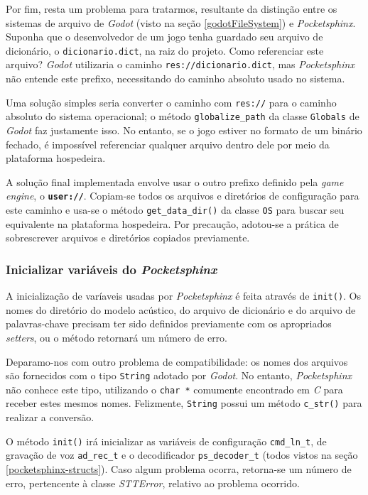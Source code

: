 Por fim, resta um problema para tratarmos, resultante da distinção entre os sistemas de arquivo de \textit{Godot} (visto na seção \ref{godotFileSystem}) e \textit{Pocketsphinx}. Suponha que o desenvolvedor de um jogo tenha guardado seu arquivo de dicionário, o \texttt{dicionario.dict}, na raiz do projeto. Como referenciar este arquivo? \textit{Godot} utilizaria o caminho \texttt{res://dicionario.dict}, mas \textit{Pocketsphinx} não entende este prefixo, necessitando do caminho absoluto usado no sistema.

Uma solução simples seria converter o caminho com \texttt{res://} para o caminho absoluto do sistema operacional; o método \texttt{globalize\_path} da classe \texttt{Globals} de \textit{Godot} faz justamente isso. No entanto, se o jogo estiver no formato de um binário fechado, é impossível referenciar qualquer arquivo dentro dele por meio da plataforma hospedeira.

A solução final implementada envolve usar o outro prefixo definido pela \textit{game engine}, o \textbf{\texttt{user://}}. Copiam-se todos os arquivos e diretórios de configuração para este caminho e usa-se o método \texttt{get\_data\_dir()} da classe \texttt{OS} para buscar seu equivalente na plataforma hospedeira. Por precaução, adotou-se a prática de sobrescrever arquivos e diretórios copiados previamente.

\subsubsection{Inicializar variáveis do \textit{Pocketsphinx}}

A inicialização de varíaveis usadas por \textit{Pocketsphinx} é feita através de \texttt{init()}. Os nomes do diretório do modelo acústico, do arquivo de dicionário e do arquivo de palavras-chave precisam ter sido definidos previamente com os apropriados \textit{setters}, ou o método retornará um número de erro.

Deparamo-nos com outro problema de compatibilidade: os nomes dos arquivos são fornecidos com o tipo \texttt{String} adotado por \textit{Godot}. No entanto, \textit{Pocketsphinx} não conhece este tipo, utilizando o \texttt{char *} comumente encontrado em \textit{C} para receber estes mesmos nomes. Felizmente, \texttt{String} possui um método \texttt{c\_str()} para realizar a conversão.

O método \texttt{init()} irá inicializar as variáveis de configuração \texttt{cmd\_ln\_t}, de gravação de voz \texttt{ad\_rec\_t} e o decodificador \texttt{ps\_decoder\_t} (todos vistos na seção \ref{pocketsphinx-structs}). Caso algum problema ocorra, retorna-se um número de erro, pertencente à classe \textit{STTError}, relativo ao problema ocorrido.

